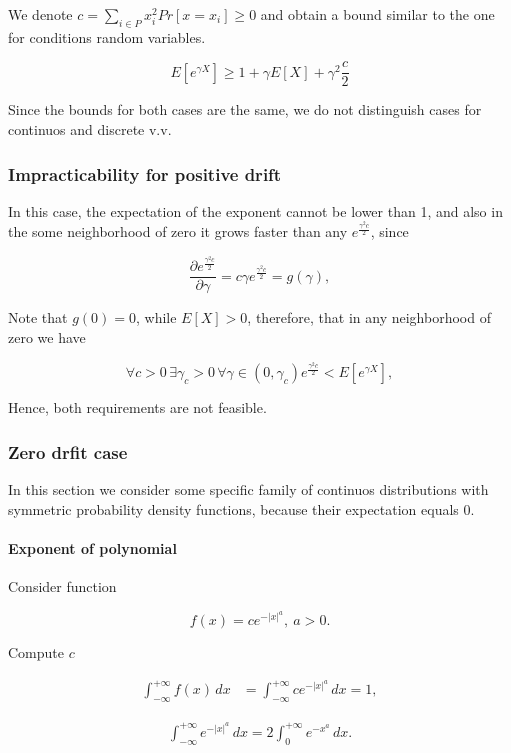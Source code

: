 \documentclass[12pt, a4paper]{article}
\theoremstyle{remark}
\newcommand{\expx}[1]{e^{-|x|^{#1}}}
\newcommand{\expxpoz}[1]{e^{-x^{#1}}}
\newcommand{\infint}[1]{\int_{-\infty}^{+\infty} #1 \, dx}
\newcommand{\infintpoz}[1]{\int_{0}^{+\infty} #1 \, dx}
\begin{document}
We denote $c = \sum_{i \in P} x_i^2 Pr[x = x_i] \geq 0$ and obtain a bound similar to the one for conditions random variables.

\[
    E[e^{\gamma X}] \geq 1 + \gamma E[X] + \gamma^2 \frac{c}{2}
\]

Since the bounds for both cases are the same, we do not distinguish cases for continuos and discrete v.v.

\subsubsection{Impracticability for positive drift}

In this case, the expectation of the exponent cannot be lower than 1, and also in the some neighborhood of zero it grows faster than any $e^{\frac{\gamma^2 c}{2}}$, since

$$\frac{\partial e^{\frac{\gamma^2 c}{2}}}{\partial \gamma} = c\gamma e^{\frac{\gamma^2 c}{2}} = g(\gamma),$$

Note that $g(0) = 0$, while $E[X] > 0$, therefore, that in any neighborhood of zero we have

$$\forall c > 0 \, \exists \gamma_c > 0 \, \forall \gamma \in (0, \gamma_c) e^{\frac{\gamma^2 c}{2}} < E[e^{\gamma X}],$$

Hence, both requirements are not feasible.

\subsubsection{Zero drfit case}
\label{sec:zero}

In this section we consider some specific family of continuos distributions with symmetric probability density functions, because their expectation equals 0.

\paragraph*{Exponent of polynomial}

\hfill

\hfill

Consider function

$$f(x) = c \expx{a},\ a > 0.$$

Compute $c$

\begin{align*}
    \infint{f(x)} & = \infint{c\expx{a}} = 1,
\end{align*}

\begin{align*}
    \infint{\expx{a}} = 2\infintpoz{\expxpoz{a}}.
\end{align*}
\end{document}
